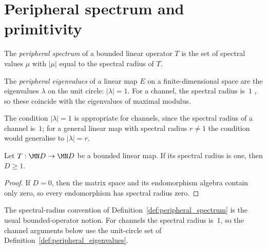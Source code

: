 \section{Peripheral spectrum and primitivity}

\begin{definition}\label{def:peripheral_spectrum}
    \leanok
    The \emph{peripheral spectrum} of a bounded linear operator $T$
    is the set of spectral values $\mu$ with
    $|\mu|$ equal to the spectral radius of $T$.
\end{definition}

\begin{definition}\label{def:peripheral_eigenvalues}
    \leanok
    The \emph{peripheral eigenvalues} of a linear map $E$ on
    a finite-dimensional space
    are the eigenvalues $\lambda$ on the unit circle:
    $|\lambda| = 1$.
    For a channel, the spectral radius is~$1$
    \cite[Proposition~6.1]{Wolf2012Quantum}, so these coincide with
    the eigenvalues of maximal modulus.

    The condition $|\lambda| = 1$ is appropriate for channels, since the
    spectral radius of a channel is~$1$; for a general linear map with
    spectral radius $r \neq 1$ the condition would generalise to
    $|\lambda| = r$.
\end{definition}

\begin{lemma}
    \label{lem:spectral_radius_one_matrix_dim_pos}
    \leanok
    Let $T:\MN D\to\MN D$ be a bounded linear map. If its spectral radius is
    one, then $D\geq1$.
\end{lemma}
\begin{proof}\leanok
    If $D=0$, then the matrix space and its endomorphism algebra contain only
    zero, so every endomorphism has spectral radius zero.
\end{proof}

\begin{remark}%
    \label{rem:peripheral_conventions_channels}
    \leanok
    The spectral-radius convention of
    Definition~\ref{def:peripheral_spectrum} is the usual bounded-operator
    notion. For channels the spectral radius is~$1$, so the channel arguments
    below use the unit-circle set of Definition~\ref{def:peripheral_eigenvalues}.
\end{remark}

